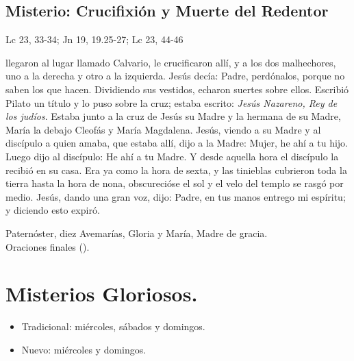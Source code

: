 \documentclass[./00_main.tex]{subfiles}
\newcounter{sorrowful-counter}
\newcounter{glorious-counter}
\begin{document}
\subsection*{ Misterio: Crucifixión y Muerte del Redentor}
\begin{flushright}
      {\color{red}Lc 23, 33-34; Jn 19, 19.25-27; Lc 23, 44-46}
\end{flushright}
 llegaron al lugar llamado Calvario, le crucificaron allí, y a los dos malhechores, uno a la derecha y otro a la izquierda. Jesús decía: 
Padre, perdónalos, porque no saben los que hacen. Dividiendo sus vestidos, echaron suertes sobre ellos. Escribió Pilato un título y lo puso sobre la cruz; 
estaba escrito: \textit{Jesús Nazareno, Rey de los judíos}. Estaba junto a la cruz de Jesús su Madre y la hermana de su Madre, María la debajo Cleofás y María Magdalena. 
Jesús, viendo a su Madre y al discípulo a quien amaba, que estaba allí, dijo a la Madre: Mujer, he ahí a tu hijo. Luego dijo al discípulo: He ahí a tu Madre. 
Y desde aquella hora el discípulo la recibió en su casa. Era ya como la hora de sexta, y las tinieblas cubrieron toda la tierra hasta la hora de nona, 
obscurecióse el sol y el velo del templo se rasgó por medio. Jesús, dando una gran voz, dijo: Padre, en tus manos entrego mi espíritu; y diciendo esto expiró.

\begin{center}
      Paternóster, diez Avemarías, Gloria y María, Madre de gracia.\\
      Oraciones finales ().
\end{center}

\section*{Misterios Gloriosos.}
\begin{itemize}
      \item Tradicional: miércoles, sábados y domingos.
      \item Nuevo: miércoles y domingos.
\end{itemize}

\end{document}

